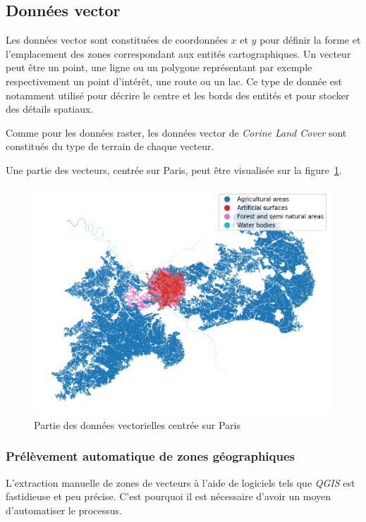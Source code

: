 \subsection{Données vector}


Les données vector sont constituées de coordonnées $x$ et $y$ pour définir la forme et l'emplacement des zones correspondant aux entités cartographiques.
Un vecteur peut être un point, une ligne ou un polygone représentant par exemple respectivement un point d'intérêt, une route ou un lac.
Ce type de donnée est notamment utilisé pour décrire le centre et les bords des entités et pour stocker des détails spatiaux.

Comme pour les données raster, les données vector de \emph{Corine Land Cover} sont constitués du type de terrain de chaque vecteur.

Une partie des vecteurs, centrée sur Paris, peut être visualisée sur la figure~\ref{fig:vector}.


\begin{figure}[!h]
    \centering
    \includegraphics[scale=0.5]{images/vector}
    \caption{Partie des données vectorielles centrée sur Paris}
    \label{fig:vector}
\end{figure}

\subsubsection{Prélèvement automatique de zones géographiques}

L'extraction manuelle de zones de vecteurs à l'aide de logiciels tels que \emph{QGIS} est fastidieuse et peu précise.
C'est pourquoi il est nécessaire d'avoir un moyen d'automatiser le processus.

